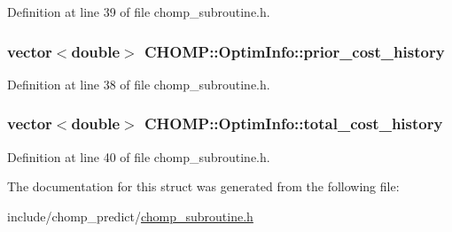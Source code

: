 Definition at line 39 of file chomp\+\_\+subroutine.\+h.

\subsubsection[{\texorpdfstring{prior\+\_\+cost\+\_\+history}{prior_cost_history}}]{\setlength{\rightskip}{0pt plus 5cm}vector$<$double$>$ C\+H\+O\+M\+P\+::\+Optim\+Info\+::prior\+\_\+cost\+\_\+history}\hypertarget{struct_c_h_o_m_p_1_1_optim_info_af3837487472aa772f6aeace2c32f356a}{}\label{struct_c_h_o_m_p_1_1_optim_info_af3837487472aa772f6aeace2c32f356a}


Definition at line 38 of file chomp\+\_\+subroutine.\+h.

\subsubsection[{\texorpdfstring{total\+\_\+cost\+\_\+history}{total_cost_history}}]{\setlength{\rightskip}{0pt plus 5cm}vector$<$double$>$ C\+H\+O\+M\+P\+::\+Optim\+Info\+::total\+\_\+cost\+\_\+history}\hypertarget{struct_c_h_o_m_p_1_1_optim_info_a47f69044821c9ff79aabd1acb5424926}{}\label{struct_c_h_o_m_p_1_1_optim_info_a47f69044821c9ff79aabd1acb5424926}


Definition at line 40 of file chomp\+\_\+subroutine.\+h.



The documentation for this struct was generated from the following file\+:\begin{DoxyCompactItemize}
\item 
include/chomp\+\_\+predict/\hyperlink{chomp__subroutine_8h}{chomp\+\_\+subroutine.\+h}\end{DoxyCompactItemize}
